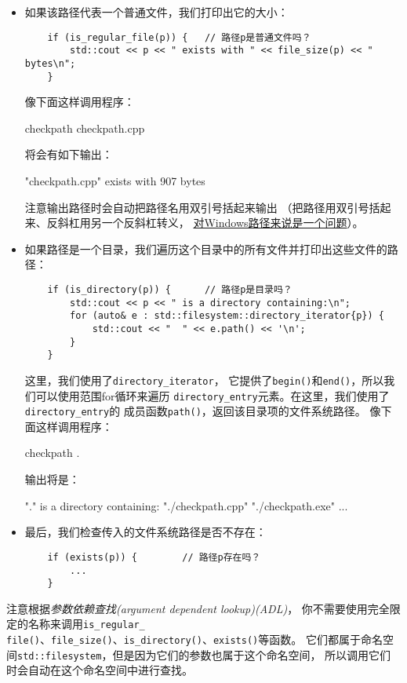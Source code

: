 \begin{itemize}
    \item 如果该路径代表一个普通文件，我们打印出它的大小：
    \begin{lstlisting}
    if (is_regular_file(p)) {   // 路径p是普通文件吗？
        std::cout << p << " exists with " << file_size(p) << " bytes\n";
    }
    \end{lstlisting}
    像下面这样调用程序：
    \begin{blacklisting}
    checkpath checkpath.cpp
    \end{blacklisting}
    将会有如下输出：
    \begin{blacklisting}
    "checkpath.cpp" exists with 907 bytes
    \end{blacklisting}
    注意输出路径时会自动把路径名用双引号括起来输出
    （把路径用双引号括起来、反斜杠用另一个反斜杠转义，
    \hyperref[ch20.1.1.1]{对Windows路径来说是一个问题}）。
    \item 如果路径是一个目录，我们遍历这个目录中的所有文件并打印出这些文件的路径：
    \begin{lstlisting}
    if (is_directory(p)) {      // 路径p是目录吗？
        std::cout << p << " is a directory containing:\n";
        for (auto& e : std::filesystem::directory_iterator{p}) {
            std::cout << "  " << e.path() << '\n';
        }
    }
    \end{lstlisting}
    这里，我们使用了\texttt{directory\_iterator}，
    它提供了\texttt{begin()}和\texttt{end()}，所以我们可以使用范围for循环来遍历
    \texttt{directory\_entry}元素。在这里，我们使用了\texttt{directory\_entry}的
    成员函数\texttt{path()}，返回该目录项的文件系统路径。
    像下面这样调用程序：
    \begin{blacklisting}
    checkpath .
    \end{blacklisting}
    输出将是：
    \begin{blacklisting}
    "." is a directory containing:
    "./checkpath.cpp"
    "./checkpath.exe"
    ...
    \end{blacklisting}
    \item 最后，我们检查传入的文件系统路径是否不存在：
    \begin{lstlisting}
    if (exists(p)) {        // 路径p存在吗？
        ...
    }
    \end{lstlisting}
\end{itemize}
注意根据\emph{参数依赖查找(argument dependent lookup)(ADL)}，
你不需要使用完全限定的名称来调用\texttt{is\_regular\_\\
file()}、\texttt{file\_size()}、\texttt{is\_directory()}、\texttt{exists()}等函数。
它们都属于命名空间\texttt{std::filesystem}，但是因为它们的参数也属于这个命名空间，
所以调用它们时会自动在这个命名空间中进行查找。


